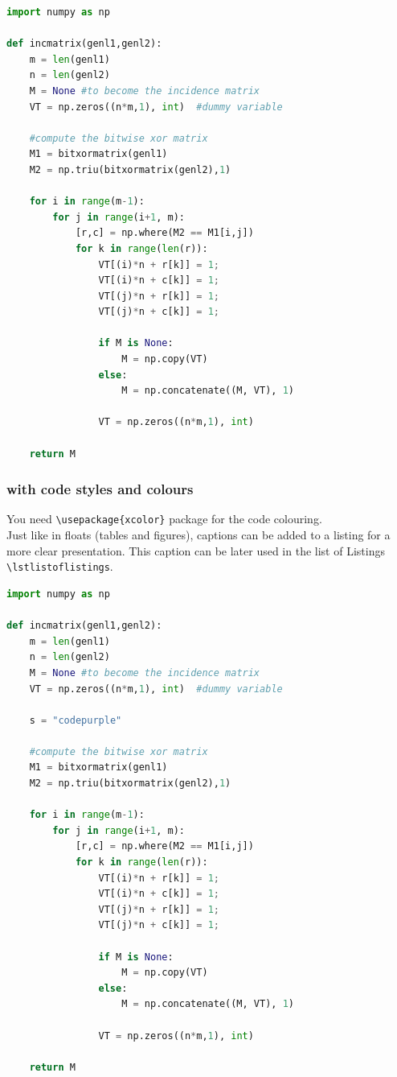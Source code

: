 \documentclass[letterpaper]{article}
\begin{document}
\begin{lstlisting}[language=Python]
import numpy as np
    
def incmatrix(genl1,genl2):
    m = len(genl1)
    n = len(genl2)
    M = None #to become the incidence matrix
    VT = np.zeros((n*m,1), int)  #dummy variable
    
    #compute the bitwise xor matrix
    M1 = bitxormatrix(genl1)
    M2 = np.triu(bitxormatrix(genl2),1) 
    
    for i in range(m-1):
        for j in range(i+1, m):
            [r,c] = np.where(M2 == M1[i,j])
            for k in range(len(r)):
                VT[(i)*n + r[k]] = 1;
                VT[(i)*n + c[k]] = 1;
                VT[(j)*n + r[k]] = 1;
                VT[(j)*n + c[k]] = 1;
    
                if M is None:
                    M = np.copy(VT)
                else:
                    M = np.concatenate((M, VT), 1)
    
                VT = np.zeros((n*m,1), int)
    
    return M
\end{lstlisting}

\subsubsection{with code styles and colours}

You need \verb+\usepackage{xcolor}+ package for the code colouring. \\
Just like in floats (tables and figures), captions can be added to a 
listing for a more clear presentation. This caption can be later used 
in the list of Listings \verb+\lstlistoflistings+.

\lstset{style=python-style}
\begin{lstlisting}[language=Python, caption=Python example]
import numpy as np
    
def incmatrix(genl1,genl2):
    m = len(genl1)
    n = len(genl2)
    M = None #to become the incidence matrix
    VT = np.zeros((n*m,1), int)  #dummy variable

    s = "codepurple"
    
    #compute the bitwise xor matrix
    M1 = bitxormatrix(genl1)
    M2 = np.triu(bitxormatrix(genl2),1) 
    
    for i in range(m-1):
        for j in range(i+1, m):
            [r,c] = np.where(M2 == M1[i,j])
            for k in range(len(r)):
                VT[(i)*n + r[k]] = 1;
                VT[(i)*n + c[k]] = 1;
                VT[(j)*n + r[k]] = 1;
                VT[(j)*n + c[k]] = 1;
    
                if M is None:
                    M = np.copy(VT)
                else:
                    M = np.concatenate((M, VT), 1)
    
                VT = np.zeros((n*m,1), int)
    
    return M
\end{lstlisting}
\end{document}
